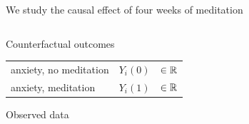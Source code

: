 \documentclass[aspectratio=169]{beamer}
\theoremstyle{remark}
\begin{document}
\begin{frame}{We study the causal effect of four weeks of meditation}

    \begin{columns}
        \begin{column}{0.6 \textwidth}

            Counterfactual outcomes

            \begin{table}[]
                \begin{tabular}{lcl}
                    anxiety, no meditation & $Y_i(0)$ & $\in \mathbb{R}$ \\
                    anxiety, meditation    & $Y_i(1)$ & $\in \mathbb{R}$
                \end{tabular}
            \end{table}

            Observed data


\end{column}
\end{columns}
\end{frame}
\end{document}

